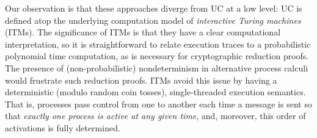 Our observation is that these approaches diverge from UC at a low level:
UC is defined atop the underlying computation model of
\emph{interactive Turing machines} (ITMs).
%
%
The significance of ITMs is that they have a clear computational interpretation,
so it is straightforward to relate execution traces to a probabilistic
polynomial time computation, as is necessary for cryptographic reduction proofs.
%
The presence of (non-probabilistic) nondeterminism in alternative process calculi
would frustrate such reduction proofs.
ITMs avoid this issue by having a deterministic
(modulo random coin tosses), single-threaded execution semantics. That is,
processes pass control from one to another each time a message is sent so that
\emph{exactly one process is active at any given time}, and, moreover, this
order of activations is fully determined.



